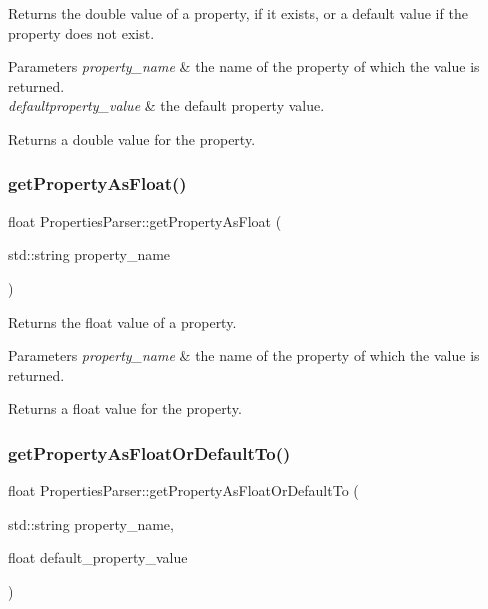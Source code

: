 Returns the double value of a property, if it exists, or a default value if the property does not exist.


\begin{DoxyParams}{Parameters}
{\em property\+\_\+name} & the name of the property of which the value is returned. \\
\hline
{\em defaultproperty\+\_\+value} & the default property value. \\
\hline
\end{DoxyParams}
\begin{DoxyReturn}{Returns}
a double value for the property. 
\end{DoxyReturn}
\mbox{\label{class_properties_parser_acfdb8d26fd4d078aa37ae938adf67379}} 
\subsubsection{\texorpdfstring{get\+Property\+As\+Float()}{getPropertyAsFloat()}}
{\footnotesize\ttfamily float Properties\+Parser\+::get\+Property\+As\+Float (\begin{DoxyParamCaption}\item[{std\+::string}]{property\+\_\+name }\end{DoxyParamCaption})}

Returns the float value of a property.


\begin{DoxyParams}{Parameters}
{\em property\+\_\+name} & the name of the property of which the value is returned. \\
\hline
\end{DoxyParams}
\begin{DoxyReturn}{Returns}
a float value for the property. 
\end{DoxyReturn}
\mbox{\label{class_properties_parser_a064cd4ecb149c7aa710d2c016a6d3371}} 
\subsubsection{\texorpdfstring{get\+Property\+As\+Float\+Or\+Default\+To()}{getPropertyAsFloatOrDefaultTo()}}
{\footnotesize\ttfamily float Properties\+Parser\+::get\+Property\+As\+Float\+Or\+Default\+To (\begin{DoxyParamCaption}\item[{std\+::string}]{property\+\_\+name,  }\item[{float}]{default\+\_\+property\+\_\+value }\end{DoxyParamCaption})}

